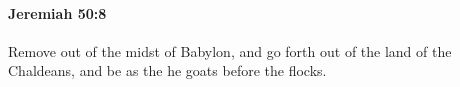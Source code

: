 
		\paragraph{Jeremiah 50:8} %
			\label{JEREMIAH-50-8}

			Remove out of the midst of Babylon, and go forth out of the land of the Chaldeans, and be as the he goats before the flocks.


